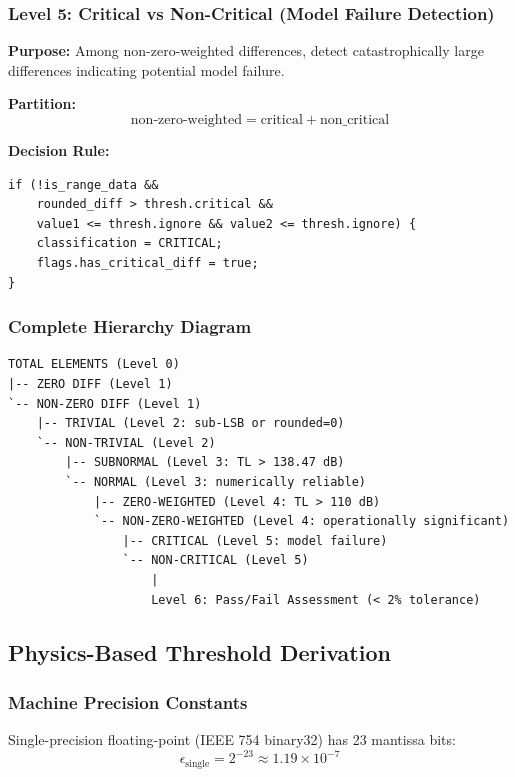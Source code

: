\documentclass[11pt,letterpaper]{article}
\begin{document}
\subsubsection{Level 5: Critical vs Non-Critical (Model Failure Detection)}

\textbf{Purpose:} Among non-zero-weighted differences, detect catastrophically large differences indicating potential model failure.

\textbf{Partition:}
\begin{equation}
    \text{non-zero-weighted} = \text{critical} + \text{non\_critical}
\end{equation}

\textbf{Decision Rule:}
\begin{verbatim}
if (!is_range_data &&
    rounded_diff > thresh.critical &&
    value1 <= thresh.ignore && value2 <= thresh.ignore) {
    classification = CRITICAL;
    flags.has_critical_diff = true;
}
\end{verbatim}

\subsubsection{Complete Hierarchy Diagram}

\begin{verbatim}
TOTAL ELEMENTS (Level 0)
|-- ZERO DIFF (Level 1)
`-- NON-ZERO DIFF (Level 1)
    |-- TRIVIAL (Level 2: sub-LSB or rounded=0)
    `-- NON-TRIVIAL (Level 2)
        |-- SUBNORMAL (Level 3: TL > 138.47 dB)
        `-- NORMAL (Level 3: numerically reliable)
            |-- ZERO-WEIGHTED (Level 4: TL > 110 dB)
            `-- NON-ZERO-WEIGHTED (Level 4: operationally significant)
                |-- CRITICAL (Level 5: model failure)
                `-- NON-CRITICAL (Level 5)
                    |
                    Level 6: Pass/Fail Assessment (< 2% tolerance)
\end{verbatim}

\subsection{Physics-Based Threshold Derivation}

\subsubsection{Machine Precision Constants}

Single-precision floating-point (IEEE 754 binary32) has 23 mantissa bits:
\begin{equation}
    \epsilon_{\text{single}} = 2^{-23} \approx 1.19 \times 10^{-7}
\end{equation}
\end{document}
